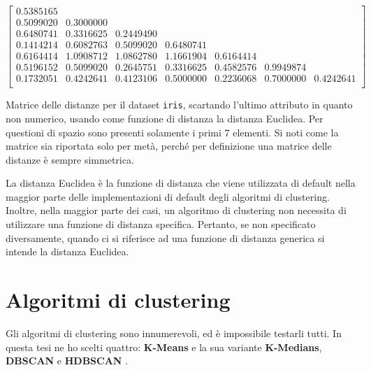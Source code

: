 \documentclass[a4paper, 12pt]{report}
\begin{document}
			\begin{table}[h]
				\begin{equation*}
					\begin{bmatrix}
						0.5385165 & & & & & & \\
						0.5099020 & 0.3000000 & & & & & \\
						0.6480741 & 0.3316625 & 0.2449490 & & & & \\
						0.1414214 & 0.6082763 & 0.5099020 & 0.6480741 & & & \\
						0.6164414 & 1.0908712 & 1.0862780 & 1.1661904 & 0.6164414 & & \\ 
						0.5196152 & 0.5099020 & 0.2645751 & 0.3316625 & 0.4582576 & 0.9949874 & \\ 
						0.1732051 & 0.4242641 & 0.4123106 & 0.5000000 & 0.2236068 & 0.7000000 & 0.4242641 \\
					\end{bmatrix}
				\end{equation*}

				\caption{Matrice delle distanze per il dataset \texttt{iris},
				scartando l'ultimo attributo in quanto non numerico, usando
				come funzione di distanza la distanza Euclidea. Per questioni
				di spazio sono presenti solamente i primi 7 elementi. Si noti
				come la matrice sia riportata solo per metà, perché per
				definizione una matrice delle distanze è sempre simmetrica.}
				\label{tab:dist}
			\end{table}

			La distanza Euclidea è la funzione di distanza che viene
			utilizzata di default nella maggior parte delle implementazioni
			di default degli algoritmi di clustering. Inoltre, nella maggior
			parte dei casi, un algoritmo di clustering non necessita di
			utilizzare una funzione di distanza specifica. Pertanto, se non
			specificato diversamente, quando ci si riferisce ad una funzione
			di distanza generica si intende la distanza Euclidea.

		\section{Algoritmi di clustering}

			Gli algoritmi di clustering sono innumerevoli, ed è
			impossibile testarli tutti. In questa tesi ne ho scelti
			quattro: \textbf{K-Means} \cite{1056489} e la sua variante
			\textbf{K-Medians}, \textbf{DBSCAN} \cite{10.5555/3001460.3001507}
			e \textbf{HDBSCAN} \cite{10.1007/978-3-642-37456-2_14}.
\end{document}
